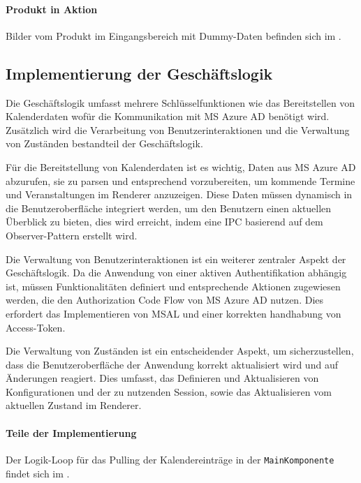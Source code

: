 \paragraph{Produkt in Aktion}
Bilder vom Produkt im Eingangsbereich mit Dummy-Daten befinden sich im .


\subsection{Implementierung der Geschäftslogik}
\label{sec:ImplementierungGeschaeftslogik}
Die Geschäftslogik umfasst mehrere Schlüsselfunktionen wie das Bereitstellen von Kalenderdaten wofür die Kommunikation mit \ac{MS} Azure \ac{AD} benötigt wird.
Zusätzlich wird die Verarbeitung von Benutzerinteraktionen und die Verwaltung von Zuständen bestandteil der Geschäftslogik.


Für die Bereitstellung von Kalenderdaten ist es wichtig, Daten aus \ac{MS} Azure \ac{AD} abzurufen, sie zu parsen und entsprechend vorzubereiten, um kommende Termine und Veranstaltungen im Renderer anzuzeigen.
Diese Daten müssen dynamisch in die Benutzeroberfläche integriert werden, um den Benutzern einen aktuellen Überblick zu bieten, dies wird erreicht, indem eine \ac{IPC} basierend auf dem Observer-Pattern erstellt wird.


Die Verwaltung von Benutzerinteraktionen ist ein weiterer zentraler Aspekt der Geschäftslogik.
Da die Anwendung von einer aktiven Authentifikation abhängig ist, müssen Funktionalitäten definiert und entsprechende Aktionen zugewiesen werden, die den Authorization Code Flow von \ac{MS} Azure \ac{AD} nutzen.
Dies erfordert das Implementieren von \ac{MSAL} und einer korrekten handhabung von Access-Token.


Die Verwaltung von Zuständen ist ein entscheidender Aspekt, um sicherzustellen, dass die Benutzeroberfläche der Anwendung korrekt aktualisiert wird und auf Änderungen reagiert.
Dies umfasst, das Definieren und Aktualisieren von Konfigurationen und der zu nutzenden Session, sowie das Aktualisieren vom aktuellen Zustand im Renderer.


\paragraph{Teile der Implementierung}
Der Logik-Loop für das Pulling der Kalendereinträge in der \texttt{Main\-Kom\-po\-nen\-te} findet sich im .
